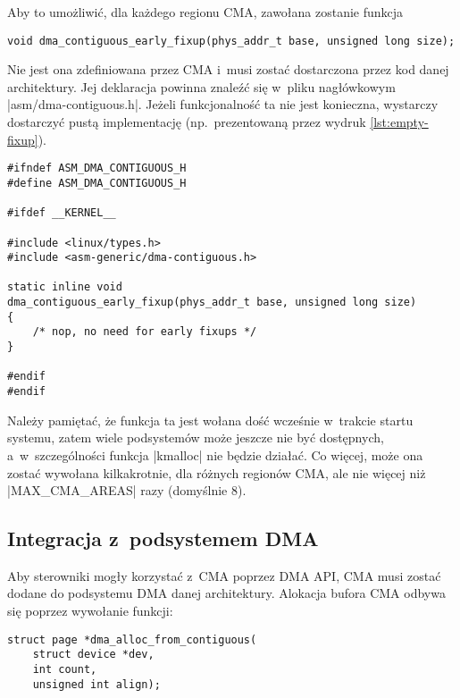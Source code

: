 Aby to umożliwić, dla każdego regionu CMA, zawołana zostanie funkcja

\begin{lstlisting}
void dma_contiguous_early_fixup(phys_addr_t base, unsigned long size);
\end{lstlisting}

Nie jest ona zdefiniowana przez CMA i~musi zostać dostarczona przez
kod danej architektury.  Jej deklaracja powinna znaleźć się w~pliku
nagłówkowym \code|asm/dma-contiguous.h|.  Jeżeli funkcjonalność
ta nie jest konieczna, wystarczy dostarczyć pustą implementację
(np.\ prezentowaną przez wydruk \ref{lst:empty-fixup}).

\begin{lstlisting}[float=tbhp,caption={[Pusta implementacja funkcji
        \code|dma_contiguous_early_fixup|.]Plik nagłówkowy
      \code|asm/dma-contiguous.h| z~pustą implementacją funkcji
      \code|dma_contiguous_early_fixup|.},label=lst:empty-fixup]
#ifndef ASM_DMA_CONTIGUOUS_H
#define ASM_DMA_CONTIGUOUS_H

#ifdef __KERNEL__

#include <linux/types.h>
#include <asm-generic/dma-contiguous.h>

static inline void
dma_contiguous_early_fixup(phys_addr_t base, unsigned long size)
{
	/* nop, no need for early fixups */
}

#endif
#endif
\end{lstlisting}

Należy pamiętać, że funkcja ta jest wołana dość wcześnie w~trakcie
startu systemu, zatem wiele podsystemów może jeszcze nie być
dostępnych, a~w~szczególności funkcja \code|kmalloc| nie będzie
działać.  Co więcej, może ona zostać wywołana kilkakrotnie, dla
różnych regionów CMA, ale nie więcej niż \code|MAX_CMA_AREAS|
razy (domyślnie 8).

\subsection{Integracja z~podsystemem DMA}\label{sec:usage-integrate}

Aby sterowniki mogły korzystać z~CMA poprzez DMA API, CMA musi zostać
dodane do podsystemu DMA danej architektury.  Alokacja bufora CMA
odbywa się poprzez wywołanie funkcji:

\begin{lstlisting}
struct page *dma_alloc_from_contiguous(
	struct device *dev,
	int count,
	unsigned int align);
\end{lstlisting}

